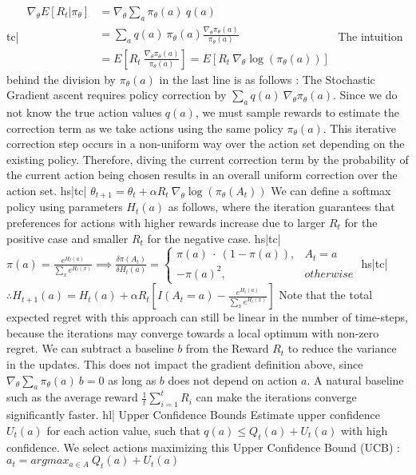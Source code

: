 tc| \( \begin{aligned} \nabla_\theta E[R_t | \pi_\theta] &= \nabla_\theta \sum_a \pi_\theta(a) \ q(a) \\ &= \sum_a q(a) \ \pi_\theta(a) \frac{\nabla_\theta \pi_\theta(a)}{\pi_\theta(a)} \\ &= E\left[R_t \ \frac{\nabla_\theta \pi_\theta(a)}{\pi_\theta(a)} \right] = E\left[ R_t \ \nabla_\theta \log(\pi_\theta(a)) \right] \end{aligned} \)
The intuition behind the division by \(\pi_\theta(a)\) in the last line is as follows : The Stochastic Gradient ascent requires policy correction by \(\sum_a q(a) \ \nabla_\theta \pi_\theta(a) \). Since we do not know the true action values \(q(a)\), we must sample rewards to estimate the correction term as we take actions using the same policy \(\pi_\theta(a)\). This iterative correction step occurs in a non-uniform way over the action set depending on the existing policy. Therefore, diving the current correction term by the probability of the current action being chosen results in an overall uniform correction over the action set.
hs|tc| \( \theta_{t+1} = \theta_t + \alpha R_t \ \nabla_\theta \log(\pi_\theta(A_t)) \)
We can define a softmax policy using parameters \(H_t(a)\) as follows, where the iteration guarantees that preferences for actions with higher rewards increase due to larger \(R_t\) for the positive case and smaller \(R_t\) for the negative case.
hs|tc| \( \pi(a) = \frac{e^{H_t(a)}}{\sum_x e^{H_t(x)}} \implies \frac{\delta \pi(A_t)}{\delta H_t(a)} = \begin{cases} \pi(a) \ \cdot \ (1 - \pi(a)), & A_t=a \\ - \pi(a)^2, & otherwise \end{cases} \)
hs|tc| \( \therefore H_{t+1}(a) = H_t(a) + \alpha R_t \left[I(A_t=a) - \frac{e^{H_t(a)}}{\sum_x e^{H_t(x)}}\right] \)
Note that the total expected regret with this approach can still be linear in the number of time-steps, because the iterations may converge towards a local optimum with non-zero regret.
We can subtract a baseline \(b\) from the Reward \(R_t\) to reduce the variance in the updates. This does not impact the gradient definition above, since \( \nabla_\theta \sum_a \pi_\theta(a) \ b = 0 \) as long as \(b\) does not depend on action \(a\). A natural baseline such as the average reward \( \frac{1}{t} \sum_{i=1}^t R_i \) can make the iterations converge significantly faster.
hl| Upper Confidence Bounds
Estimate upper confidence \(U_t(a)\) for each action value, such that \( q(a) \le Q_t(a) + U_t(a) \) with high confidence. We select actions maximizing this Upper Confidence Bound (UCB) : \( a_t = argmax_{a \in A} \ Q_t(a) + U_t(a) \)
